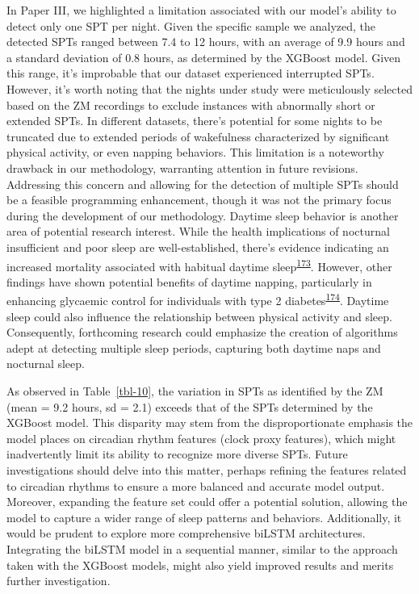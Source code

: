 \documentclass[
  10pt,
]{scrbook}
\begin{document}
In Paper III, we highlighted a limitation associated with our model's
ability to detect only one SPT per night. Given the specific sample we
analyzed, the detected SPTs ranged between 7.4 to 12 hours, with an
average of 9.9 hours and a standard deviation of 0.8 hours, as
determined by the XGBoost model. Given this range, it's improbable that
our dataset experienced interrupted SPTs. However, it's worth noting
that the nights under study were meticulously selected based on the ZM
recordings to exclude instances with abnormally short or extended SPTs.
In different datasets, there's potential for some nights to be truncated
due to extended periods of wakefulness characterized by significant
physical activity, or even napping behaviors. This limitation is a
noteworthy drawback in our methodology, warranting attention in future
revisions. Addressing this concern and allowing for the detection of
multiple SPTs should be a feasible programming enhancement, though it
was not the primary focus during the development of our methodology.
Daytime sleep behavior is another area of potential research interest.
While the health implications of nocturnal insufficient and poor sleep
are well-established, there's evidence indicating an increased mortality
associated with habitual daytime
sleep\textsuperscript{\protect\hyperlink{ref-burazeri_2003}{173}}.
However, other findings have shown potential benefits of daytime
napping, particularly in enhancing glycaemic control for individuals
with type 2
diabetes\textsuperscript{\protect\hyperlink{ref-makino_2018}{174}}.
Daytime sleep could also influence the relationship between physical
activity and sleep. Consequently, forthcoming research could emphasize
the creation of algorithms adept at detecting multiple sleep periods,
capturing both daytime naps and nocturnal sleep.

As observed in Table~\ref{tbl-10}, the variation in SPTs as identified
by the ZM (mean = 9.2 hours, sd = 2.1) exceeds that of the SPTs
determined by the XGBoost model. This disparity may stem from the
disproportionate emphasis the model places on circadian rhythm features
(clock proxy features), which might inadvertently limit its ability to
recognize more diverse SPTs. Future investigations should delve into
this matter, perhaps refining the features related to circadian rhythms
to ensure a more balanced and accurate model output. Moreover, expanding
the feature set could offer a potential solution, allowing the model to
capture a wider range of sleep patterns and behaviors. Additionally, it
would be prudent to explore more comprehensive biLSTM architectures.
Integrating the biLSTM model in a sequential manner, similar to the
approach taken with the XGBoost models, might also yield improved
results and merits further investigation.
\end{document}
